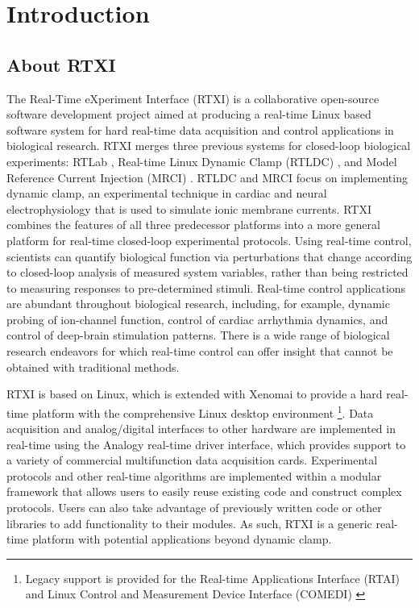\chapter{Introduction}

\section{About RTXI}

The Real-Time eXperiment Interface (RTXI) is a collaborative open-source software development project aimed at producing a real-time Linux based software system for hard real-time data acquisition and control applications in biological research. RTXI merges three previous systems for closed-loop biological experiments: RTLab \cite{Culianu:2001fk,Culianu:2002uq}, Real-time Linux Dynamic Clamp (RTLDC) \cite{Dorval:2001p940}, and Model Reference Current Injection (MRCI) \cite{Butera:2001p910,Raikov:2004p1166}. RTLDC and MRCI focus on implementing dynamic clamp, an experimental technique in cardiac and neural electrophysiology that is used to simulate ionic membrane currents. RTXI combines the features of all three predecessor platforms into a more general platform for real-time closed-loop experimental protocols. Using real-time control, scientists can quantify biological function via perturbations that change according to closed-loop analysis of measured system variables, rather than being restricted to measuring responses to pre-determined stimuli. Real-time control applications are abundant throughout biological research, including, for example, dynamic probing of ion-channel function, control of cardiac arrhythmia dynamics, and control of deep-brain stimulation patterns. There is a wide range of biological research endeavors for which real-time control can offer insight that cannot be obtained with traditional methods. 

RTXI is based on Linux, which is extended with Xenomai \cite{Xenomai:vn} to provide a hard real-time platform with the comprehensive Linux desktop environment \footnote{Legacy support is provided for the Real-time Applications Interface (RTAI) \cite{RTAI:vn} and Linux Control and Measurement Device Interface (COMEDI) \cite{COMEDI:uq}}. Data acquisition and analog/digital interfaces to other hardware are implemented in real-time using the Analogy real-time driver interface, which provides support to a variety of commercial multifunction data acquisition cards. Experimental protocols and other real-time algorithms are implemented within a modular framework that  allows users to easily reuse existing code and construct complex protocols. Users can also take advantage of previously written code or other \cpp libraries to add functionality to their modules. As such, RTXI is a generic real-time platform with potential applications beyond dynamic clamp.\

